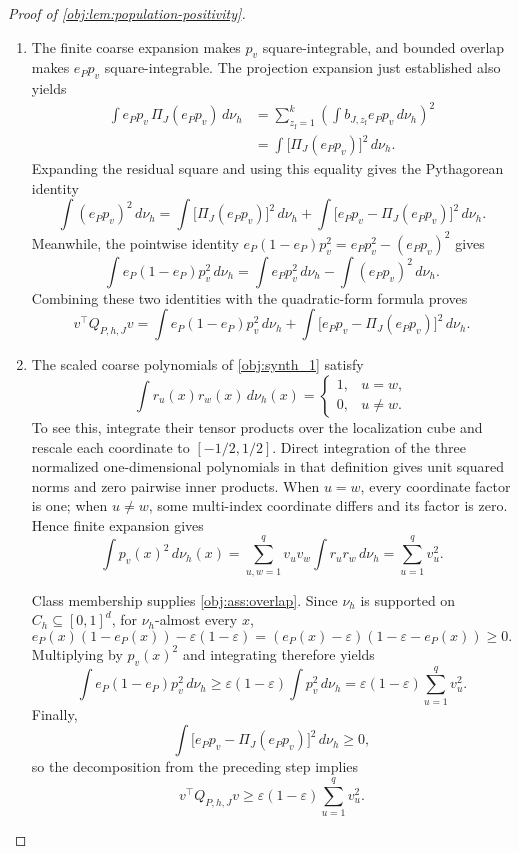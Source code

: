 \begin{proof}[Proof of \cref{obj:lem:population-positivity}]
\begin{enumerate}
\item The finite coarse expansion makes \(p_v\) square-integrable, and bounded overlap makes \(e_Pp_v\) square-integrable. The projection expansion just established also yields
\[
\begin{aligned}
\int e_Pp_v\,\Pi_J(e_Pp_v)\,d\nu_h
&=\sum_{z_{\mathrm f}=1}^{k}
 \left(\int b_{J,z_{\mathrm f}}e_Pp_v\,d\nu_h\right)^2\\
&=\int \bigl[\Pi_J(e_Pp_v)\bigr]^2\,d\nu_h.
\end{aligned}
\]
Expanding the residual square and using this equality gives the Pythagorean identity
\[
\int (e_Pp_v)^2\,d\nu_h
=
\int \bigl[\Pi_J(e_Pp_v)\bigr]^2\,d\nu_h
+\int \bigl[e_Pp_v-\Pi_J(e_Pp_v)\bigr]^2\,d\nu_h.
\]
Meanwhile, the pointwise identity
\(e_P(1-e_P)p_v^2=e_Pp_v^2-(e_Pp_v)^2\) gives
\[
\int e_P(1-e_P)p_v^2\,d\nu_h
=
\int e_Pp_v^2\,d\nu_h-\int(e_Pp_v)^2\,d\nu_h.
\]
Combining these two identities with the quadratic-form formula proves
\[
v^\top Q_{P,h,J}v
=
\int e_P(1-e_P)p_v^2\,d\nu_h
+\int\bigl[e_Pp_v-\Pi_J(e_Pp_v)\bigr]^2\,d\nu_h.
\]

\item The scaled coarse polynomials of \cref{obj:synth_1} satisfy
\[
\int r_u(x)r_w(x)\,d\nu_h(x)
=
\begin{cases}
1,&u=w,\\
0,&u\ne w.
\end{cases}
\]
To see this, integrate their tensor products over the localization cube and rescale each coordinate to \([-1/2,1/2]\). Direct integration of the three normalized one-dimensional polynomials in that definition gives unit squared norms and zero pairwise inner products. When \(u=w\), every coordinate factor is one; when \(u\ne w\), some multi-index coordinate differs and its factor is zero. Hence finite expansion gives
\[
\int p_v(x)^2\,d\nu_h(x)
=\sum_{u,w=1}^{q}v_uv_w\int r_ur_w\,d\nu_h
=\sum_{u=1}^{q}v_u^2.
\]

Class membership supplies \cref{obj:ass:overlap}. Since \(\nu_h\) is supported on \(C_h\subseteq[0,1]^d\), for \(\nu_h\)-almost every \(x\),
\[
e_P(x)(1-e_P(x))-\varepsilon(1-\varepsilon)
=
\left(e_P(x)-\varepsilon\right)
\left(1-\varepsilon-e_P(x)\right)
\ge0.
\]
Multiplying by \(p_v(x)^2\) and integrating therefore yields
\[
\int e_P(1-e_P)p_v^2\,d\nu_h
\ge\varepsilon(1-\varepsilon)\int p_v^2\,d\nu_h
=\varepsilon(1-\varepsilon)\sum_{u=1}^{q}v_u^2.
\]
Finally,
\[
\int\bigl[e_Pp_v-\Pi_J(e_Pp_v)\bigr]^2\,d\nu_h\ge0,
\]
so the decomposition from the preceding step implies
\[
v^\top Q_{P,h,J}v\ge\varepsilon(1-\varepsilon)\sum_{u=1}^{q}v_u^2.
\]
\end{enumerate}
\end{proof}

